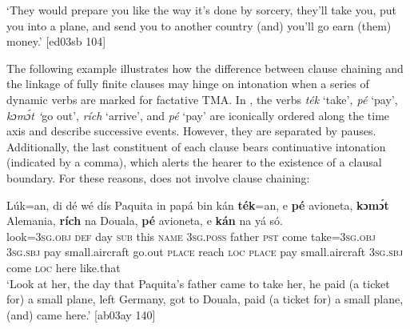 \glt ‘They would prepare you like the way it’s done by sorcery, they’ll take you, 
put you into a plane, and send you to another country (and) you’ll go earn 
(them) money.’ [ed03sb 104]
\z

The following example illustrates how the difference between clause chaining and the linkage of fully finite clauses may hinge on intonation when a series of dynamic verbs are marked for factative TMA. In , the verbs \textit{ték} ‘take’\textit{, pé} ‘pay’,\textit{ kɔmɔ́t ‘}go out’,\textit{ rích} ‘arrive’, and \textit{pé} ‘pay’ are iconically ordered along the time axis and describe successive events. However, they are separated by pauses. Additionally, the last constituent of each clause bears continuative intonation (indicated by a comma), which alerts the hearer to the existence of a clausal boundary. For these reasons,  does not involve clause chaining: 



\ea%
    \label{ex:key:1612}
    \gll Lúk=an,    di  dé  wé  dís  Paquita  in    papá  bin  kán    \textbf{ték}=an,
e    \textbf{pé}  avioneta,      \textbf{kɔmɔ́t}  Alemania,  \textbf{rích}    na  Douala,
\textbf{pé}  avioneta,      e    \textbf{kán}    na  yá    só.\\
look=\textsc{3sg.obj}  \textsc{def}  day  \textsc{sub}  this  \textsc{name}  \textsc{3sg.poss}  father  \textsc{pst}  come  take=\textsc{3sg.obj}
\textsc{3sg.sbj}  pay  small.aircraft    go.out  \textsc{place}    reach  \textsc{loc}  \textsc{place}
pay  small.aircraft    \textsc{3sg.sbj}  come  \textsc{loc}  here    like.that\\

\glt ‘Look at her, the day that Paquita’s father came to take her, he paid (a ticket for) a small plane, 
left Germany, got to Douala, paid (a ticket for) a small plane, (and) came here.’ [ab03ay 140]
\z

